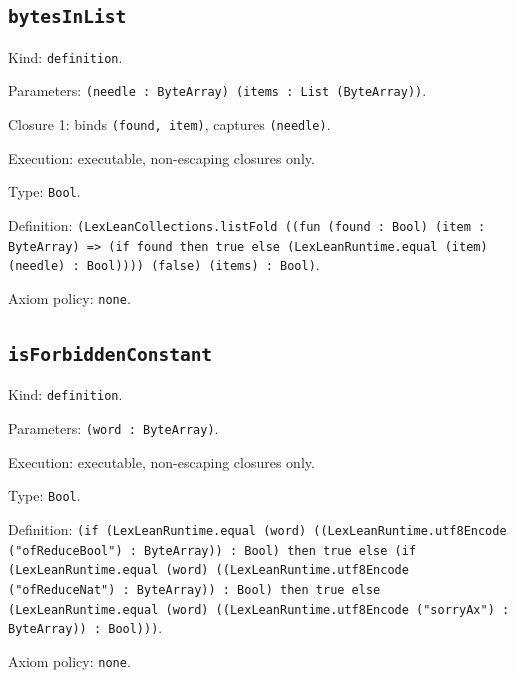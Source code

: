 \documentclass[11pt]{article}
\begin{document}
\subsection*{\texttt{bytesInList}}
\noindent Kind: \texttt{definition}.\par
\noindent Parameters: \texttt{(needle : ByteArray) (items : List (ByteArray))}.\par
\noindent Closure 1: binds \texttt{(found, item)}, captures \texttt{(needle)}.\par
\noindent Execution: executable, non-escaping closures only.\par
\noindent Type: \texttt{Bool}.\par
\noindent Definition: \texttt{(LexLeanCollections.listFold ((fun (found : Bool) (item : ByteArray) => (if found then true else (LexLeanRuntime.equal (item) (needle) : Bool)))) (false) (items) : Bool)}.\par
\noindent Axiom policy: \texttt{none}.\par
\subsection*{\texttt{isForbiddenConstant}}
\noindent Kind: \texttt{definition}.\par
\noindent Parameters: \texttt{(word : ByteArray)}.\par
\noindent Execution: executable, non-escaping closures only.\par
\noindent Type: \texttt{Bool}.\par
\noindent Definition: \texttt{(if (LexLeanRuntime.equal (word) ((LexLeanRuntime.utf8Encode ("ofReduceBool") : ByteArray)) : Bool) then true else (if (LexLeanRuntime.equal (word) ((LexLeanRuntime.utf8Encode ("ofReduceNat") : ByteArray)) : Bool) then true else (LexLeanRuntime.equal (word) ((LexLeanRuntime.utf8Encode ("sorryAx") : ByteArray)) : Bool)))}.\par
\noindent Axiom policy: \texttt{none}.\par
\end{document}
